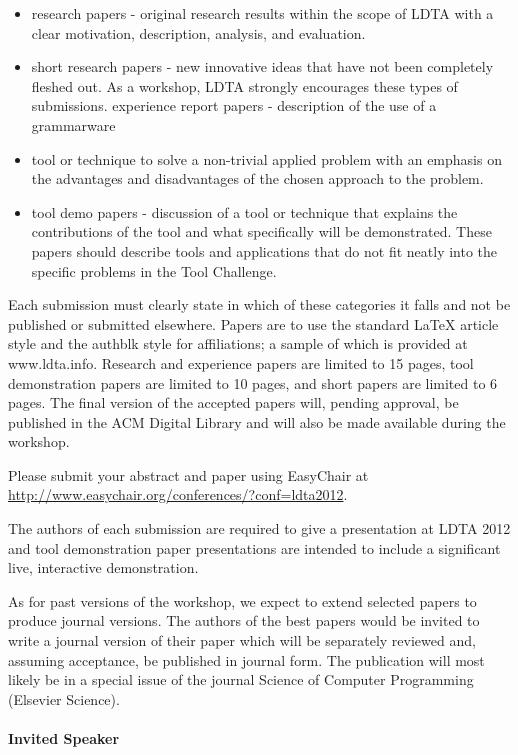 \documentclass[letterpaper, twocolumn, 9pt]{article}
\begin{document}
\begin{itemize}
  \item research papers - original research results within the scope of LDTA
  with a clear motivation, description, analysis, and evaluation.
\item short research papers - new innovative ideas that have not been
  completely fleshed out. As a workshop, LDTA strongly encourages
  these types of submissions.
  experience report papers - description of the use of a grammarware
\item tool or technique to solve a non-trivial applied problem with an
  emphasis on the advantages and disadvantages of the chosen approach
  to the problem.
\item tool demo papers - discussion of a tool or technique that explains
  the contributions of the tool and what specifically will be
  demonstrated. These papers should describe tools and applications
  that do not fit neatly into the specific problems in the Tool
  Challenge.
\end{itemize}

Each submission must clearly state in which of these categories it
falls and not be published or submitted elsewhere. Papers are to use
the standard LaTeX article style and the authblk style for
affiliations; a sample of which is provided at www.ldta.info. Research
and experience papers are limited to 15 pages, tool demonstration
papers are limited to 10 pages, and short papers are limited to 6
pages. The final version of the accepted papers will, pending
approval, be published in the ACM Digital Library and will also be
made available during the workshop.

Please submit your abstract and paper using EasyChair at
\url{http://www.easychair.org/conferences/?conf=ldta2012}.

The authors of each submission are required to give a presentation at
LDTA 2012 and tool demonstration paper presentations are intended to
include a significant live, interactive demonstration.

As for past versions of the workshop, we expect to extend selected
papers to produce journal versions. The authors of the best papers
would be invited to write a journal version of their paper which will
be separately reviewed and, assuming acceptance, be published in
journal form. The publication will most likely be in a special issue
of the journal Science of Computer Programming (Elsevier Science).

\paragraph{\textsf{Invited Speaker}} ~
\end{document}
